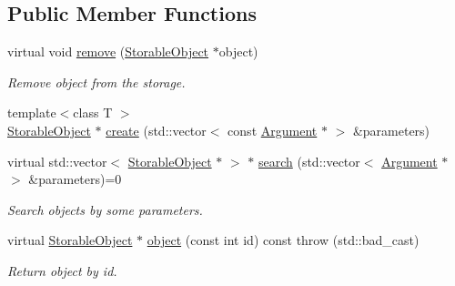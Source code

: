 \subsection*{Public Member Functions}
\begin{DoxyCompactItemize}
\item 
virtual void \hyperlink{classStorage_1_1AbstractStorage_a5d114117d4954e01fd650251b829fdbf}{remove} (\hyperlink{classStorage_1_1StorableObject}{StorableObject} $\ast$object)
\begin{DoxyCompactList}\small\item\em Remove object from the storage. \item\end{DoxyCompactList}\item 
{\footnotesize template$<$class T $>$ }\\\hyperlink{classStorage_1_1StorableObject}{StorableObject} $\ast$ \hyperlink{classStorage_1_1AbstractStorage_a108af124f19c0ae9a4a461aee6abc3ec}{create} (std::vector$<$ const \hyperlink{structStorage_1_1AbstractStorage_1_1Argument}{Argument} $\ast$ $>$ \&parameters)
\item 
virtual std::vector$<$ \hyperlink{classStorage_1_1StorableObject}{StorableObject} $\ast$ $>$ $\ast$ \hyperlink{classStorage_1_1AbstractStorage_a9304eea8cd6fffd77b1ccd26f85a061c}{search} (std::vector$<$ \hyperlink{structStorage_1_1AbstractStorage_1_1Argument}{Argument} $\ast$ $>$ \&parameters)=0
\begin{DoxyCompactList}\small\item\em Search objects by some parameters. \item\end{DoxyCompactList}\item 
virtual \hyperlink{classStorage_1_1StorableObject}{StorableObject} $\ast$ \hyperlink{classStorage_1_1AbstractStorage_a21ff57c954664abb78d1d658a1da7afa}{object} (const int id) const   throw (std::bad\_\-cast)
\begin{DoxyCompactList}\small\item\em Return object by id. \item\end{DoxyCompactList}\end{DoxyCompactItemize}
